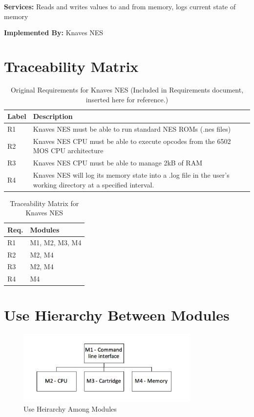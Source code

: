 \documentclass[12pt]{article}
\begin{document}
		\textbf{Services: } Reads and writes values to and from memory, logs current state of memory

		\textbf{Implemented By: } Knaves NES

\section{Traceability Matrix}
	\begin{table}[H]
		\centering
		\begin{tabular}{ p{2in} p{2in} }
			\hline
			\textbf{Label} & \textbf{Description} \\
			\hline
			R1 & Knaves NES must be able to run standard NES ROMs (.nes files) \\
			R2 & Knaves NES CPU must be able to execute opcodes from the 6502 MOS CPU architecture\\
			R3 & Knaves NES CPU must be able to manage 2kB of RAM\\
			R4 & Knaves NES will log its memory state into a .log file in the user’s working directory at a specified interval.\\
		\end{tabular}
		\caption{Original Requirements for Knaves NES (Included in Requirements document, inserted here for reference.)}
	\end{table}

	\begin{table}[H]
		\centering
		\begin{tabular}{ p{2in}  p{2in} }
			\hline
			\textbf{Req.} & \textbf{Modules} \\
			\hline
			R1 & M1, M2, M3, M4\\
			R2 & M2, M4\\
			R3 & M2, M4\\
			R4 & M4\\
		\end{tabular}
		\caption{Traceability Matrix for Knaves NES}
	\end{table}



\section{Use Hierarchy Between Modules}
	\begin{figure}[H]
		\centering
		\includegraphics[width=90mm]{trace.jpg}
		\caption{Use Heirarchy Among Modules}
	\end{figure}
\end{document}
